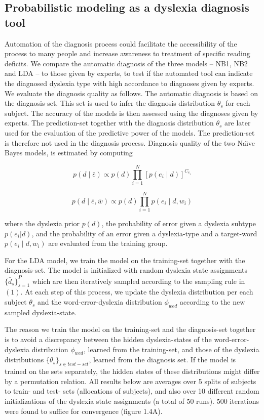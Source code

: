 {{\subsection{Probabilistic modeling as a dyslexia diagnosis tool}
Automation of the diagnosis process could facilitate the accessibility of the process to many people and increase awareness to treatment of specific reading deficits. We compare the automatic diagnosis of the three models -- NB1, NB2 and LDA -- to those given by experts, to test if the automated tool can indicate the diagnosed dyslexia type with high accordance to diagnoses given by experts.
We evaluate the diagnosis quality as follows. The automatic diagnosis is based on the diagnosis-set. This set is used to infer the diagnosis distribution $ \theta_{s} $ for each subject. The accuracy of the models is then assessed using the diagnoses given by experts. The prediction-set together with the diagnosis distribution $ \theta_{s} $ are later used for the evaluation of the predictive power of the models. The prediction-set is therefore not used in the diagnosis process.
Diagnosis quality of the two Na\"{\i}ve Bayes models, is estimated by computing 

\begin{equation}
p(d \mid \bar{e}) \propto p(d) \prod_{i = 1}^N [p(e_i \mid d)]^{C_{e_i}}
\end{equation}

\begin{equation}
p(d \mid \bar{e}, \bar{w}) \propto p(d) \prod_{i = 1}^N p(e_i \mid d, w_i)
\end{equation}

where the dyslexia prior $ p(d) $, the probability of error given a dyslexia subtype $ p(e_i |d) $, and the probability of an error given a dyslexia-type and a target-word $ p(e_i \mid d,w_i ) $ are evaluated from the training group.

For the LDA model, we train the model on the training-set together with the diagnosis-set. The model is initialized with random dyslexia state assignments $ { \{ \bar{d}_{s} \} }_{s=1}^P $ which are then iteratively sampled according to the sampling rule in $(1)$. At each step of this process, we update the dyslexia distribution per each subject $ \theta_{s} $ and the word-error-dyslexia distribution $ \phi_{wed} $ according to the new sampled dyslexia-state.

The reason we train the model on the training-set and the diagnosis-set together is to avoid a discrepancy between the hidden dyslexia-states of the word-error-dyslexia distribution $ \phi_{wed} $, learned from the training-set, and those of the dyslexia distributions $ { \{ \theta_{s} \} }_{s \in test-set} $, learned from the diagnosis set. If the model is trained on the sets separately, the hidden states of these distributions might differ by a permutation relation. All results below are averages over 5 splits of subjects to train- and test- sets (allocations of subjects), and also over 10 different random initializations of the dyslexia state assignments (a total of 50 runs). 500 iterations were found to suffice for convergence (figure 1.4A).

}}
